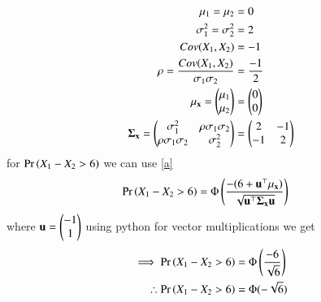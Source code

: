 \documentclass[journal,12pt,twocolumn]{IEEEtran}
\begin{document}
\begin{align}
    \mu_1=\mu_2&=0\\
    \sigma^2_1=\sigma^2_2&=2\\
    Cov(X_1,X_2)&=-1\\
    \rho=\frac{Cov(X_1,X_2)}{\sigma_1\sigma_2}&=\frac{-1}{2}\\
    \mathbf{\mu_{\mathbf{x}}}=\begin{pmatrix}\mu_1\\
                                    \mu_2\end{pmatrix}&=\begin{pmatrix}0\\
                                                  0\end{pmatrix}\\
     \mathbf{\Sigma_{\mathbf{x}}}=\begin{pmatrix}\sigma_1^2&\rho\sigma_1\sigma_2\\
                                        \rho\sigma_1\sigma_2&\sigma_2^2\end{pmatrix}&=\begin{pmatrix}2&-1\\
                                                                                -1&2\end{pmatrix}
\end{align}
for $\Pr\left(X_1-X_2>6\right)$ we can use \eqref{a}
\begin{align}
    \Pr\left(X_1-X_2>6\right)&=\Phi\left(\frac{-(6+\mathbf{u}^{\top}\mathbf{\mu_{\mathbf{x}})}}{\sqrt{\mathbf{u}^{\top}\mathbf{\Sigma_{\mathbf{x}}}\mathbf{u}}}\right)
\end{align}
where $\mathbf{u}=\begin{pmatrix}-1\\
                        1\end{pmatrix}$ using python for vector multiplications we get
\begin{align}
    \implies \Pr\left(X_1-X_2>6\right)&=\Phi\left(\frac{-6}{\sqrt{6}}\right)\\
    \therefore \Pr\left(X_1-X_2>6\right)&=\Phi(-\sqrt{6})
\end{align}
\end{document}
